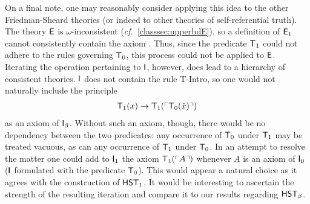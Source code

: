 \documentclass[UKenglish,cleveref,DIV=12]{scrartcl}
\theoremstyle{definition}
\theoremstyle{definition}
\begin{document}
 On a final note, one may
reasonably consider applying this idea to the other Friedman-Sheard
theories (or indeed to other theories of self-referential truth). The
theory $\mathsf{E}$ is $\omega$-inconsistent ({\em cf.}~\cref{classsec:upperbdE}),
so a definition of $\mathsf{E}_1$ cannot consistently contain the axiom
. Thus, since the predicate $\mathsf{T}_1$ could not adhere to the
rules governing $\mathsf{T}_0$, this process could not be applied to $\mathsf{E}$. Iterating the
operation pertaining to $\mathsf{I}$, however, does lead to a hierarchy of consistent
theories. $\mathsf{I}$ does not contain the rule T-Intro, so one would not naturally include the principle
\begin{align*}
  \mathsf{T}_1(x)\rightarrow \mathsf{T}_1(\ulcorner{\mathsf{T}_0(\dot x)}\urcorner)
\end{align*}
as an axiom of $\mathsf{I}_\beta$. Without such an axiom, though, there would be no dependency between the two
predicates: any occurrence of $\mathsf{T}_0$ under $\mathsf{T}_1$ may be treated vacuous, as can
any occurrence of $\mathsf{T}_1$ under $\mathsf{T}_0$. In an attempt to resolve the matter one
could add to $\mathsf{I}_1$ the axiom $\mathsf{T}_1(\ulcorner{A}\urcorner)$ whenever $A$ is an axiom of $\mathsf{I}_0$
($\mathsf{I}$ formulated with the predicate $\mathsf{T}_0$). This would appear a natural choice
as it agrees with the construction of $\mathsf{HST}_1$.
It would be interesting to ascertain the strength of the resulting
iteration and compare it to our results regarding $\mathsf{HST}_\beta$.

\end{document}
